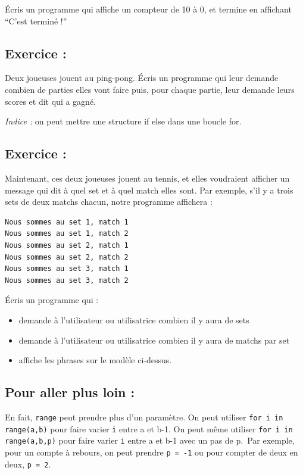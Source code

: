 \documentclass[a4paper,french,11pt]{article}
\begin{document}
Écris un programme qui affiche un compteur de 10 à 0, et termine en
affichant ``C'est terminé !''

\hypertarget{exercice-15}{%
\subsection{Exercice :}\label{exercice-15}}

Deux joueuses jouent au ping-pong. Écris un programme qui leur demande
combien de parties elles vont faire puis, pour chaque partie, leur
demande leurs scores et dit qui a gagné.

\emph{Indice :} on peut mettre une structure if else dans une boucle
for.

\hypertarget{exercice-16}{%
\subsection{Exercice :}\label{exercice-16}}

Maintenant, ces deux joueuses jouent au tennis, et elles voudraient
afficher un message qui dit à quel set et à quel match elles sont. Par
exemple, s'il y a trois sets de deux matchs chacun, notre programme
affichera :

\begin{verbatim}
Nous sommes au set 1, match 1
Nous sommes au set 1, match 2
Nous sommes au set 2, match 1
Nous sommes au set 2, match 2
Nous sommes au set 3, match 1
Nous sommes au set 3, match 2
\end{verbatim}

Écris un programme qui :

\begin{itemize}
\item
  demande à l'utilisateur ou utilisatrice combien il y aura de sets
\item
  demande à l'utilisateur ou utilisatrice combien il y aura de matchs
  par set
\item
  affiche les phrases sur le modèle ci-dessus.
\end{itemize}

\hypertarget{pour-aller-plus-loin-1}{%
\subsection{Pour aller plus loin :}\label{pour-aller-plus-loin-1}}

En fait, \texttt{range} peut prendre plus d'un paramètre. On
peut utiliser \texttt{for i in range(a,b)} pour faire varier
\texttt{i} entre a et b-1. On peut même utiliser
\texttt{for i in range(a,b,p)} pour faire varier
\texttt{i} entre a et b-1 avec un pas de p.~Par exemple,
pour un compte à rebours, on peut prendre \texttt{p = -1} ou
pour compter de deux en deux, \texttt{p = 2}.
\end{document}
